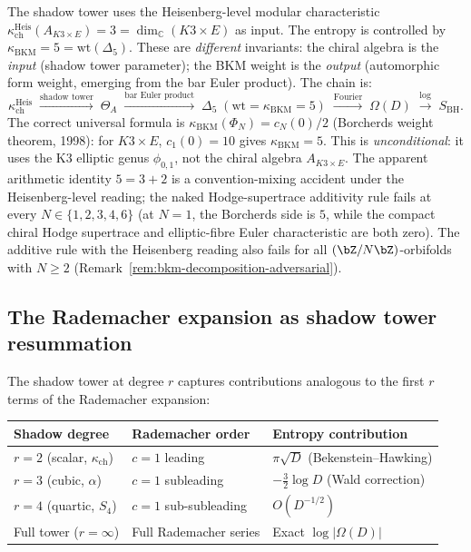 \begin{remark}
\label{rem:k3e-kappa-entropy}
The shadow tower uses the Heisenberg-level modular characteristic $\kappa_{\mathrm{ch}}^{\mathrm{Heis}}(A_{K3 \times E}) = 3 = \dim_{\mathbb{C}}(K3 \times E)$ as input. The entropy is controlled by $\kappa_{\mathrm{BKM}} = 5 = \mathrm{wt}(\Delta_5)$. These are \emph{different} invariants: the chiral algebra is the \emph{input} (shadow tower parameter); the BKM weight is the \emph{output} (automorphic form weight, emerging from the bar Euler product). The chain is:
\[
 \kappa_{\mathrm{ch}}^{\mathrm{Heis}} \;\xrightarrow{\text{shadow tower}}\; \Theta_A \;\xrightarrow{\text{bar Euler product}}\; \Delta_5 \;(\mathrm{wt} = \kappa_{\mathrm{BKM}} = 5) \;\xrightarrow{\text{Fourier}}\; \Omega(D) \;\xrightarrow{\log}\; S_{\mathrm{BH}}.
\]
The correct universal formula is $\kappa_{\mathrm{BKM}}(\Phi_N) = c_N(0)/2$ (Borcherds weight theorem, 1998): for $K3 \times E$, $c_1(0) = 10$ gives $\kappa_{\mathrm{BKM}} = 5$. This is \emph{unconditional}: it uses the K3 elliptic genus $\phi_{0,1}$, not the chiral algebra $A_{K3 \times E}$. The apparent arithmetic identity $5 = 3 + 2$ is a convention-mixing accident under the Heisenberg-level reading; the naked Hodge-supertrace additivity rule fails at every $N \in \{1, 2, 3, 4, 6\}$ (at $N = 1$, the Borcherds side is $5$, while the compact chiral Hodge supertrace and elliptic-fibre Euler characteristic are both zero). The additive rule with the Heisenberg reading also fails for all $(\bZ/N\bZ)$-orbifolds with $N \ge 2$ (Remark~\ref{rem:bkm-decomposition-adversarial}).
\end{remark}

\subsection{The Rademacher expansion as shadow tower resummation}
\label{subsec:k3e-shadow-rademacher}

The shadow tower at degree $r$ captures contributions analogous to the first $r$ terms of the Rademacher expansion:

\begin{center}
\renewcommand{\arraystretch}{1.3}
\begin{tabular}{@{}lll@{}}
\textbf{Shadow degree} & \textbf{Rademacher order} & \textbf{Entropy contribution} \\ \hline
$r = 2$ (scalar, $\kappa_{\mathrm{ch}}$) & $c = 1$ leading & $\pi\sqrt{D}$ (Bekenstein--Hawking) \\
$r = 3$ (cubic, $\alpha$) & $c = 1$ subleading & $-\frac{3}{2}\log D$ (Wald correction) \\
$r = 4$ (quartic, $S_4$) & $c = 1$ sub-subleading & $O(D^{-1/2})$ \\
Full tower ($r = \infty$) & Full Rademacher series & Exact $\log|\Omega(D)|$ \\
\end{tabular}
\end{center}

